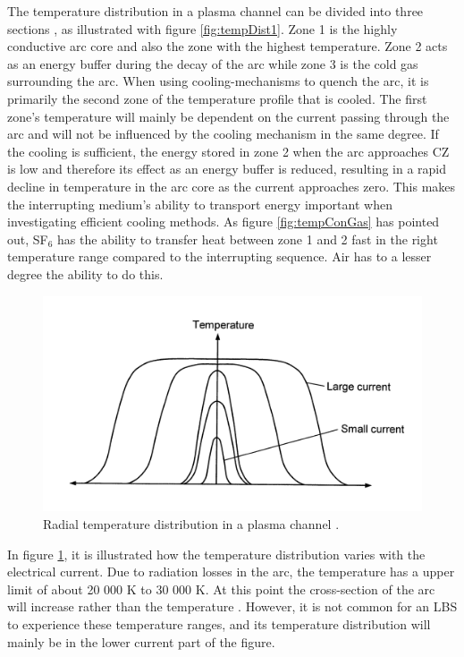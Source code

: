 \documentclass[10pt,a4paper,twoside]{article}
\begin{document}
The temperature distribution in a plasma channel can be divided into three sections \cite{bib:TDCIGBB}, as illustrated with figure \ref{fig:tempDist1}. Zone 1 is the highly conductive arc core and also the zone with the highest temperature. Zone 2 acts as an energy buffer during the decay of the arc while zone 3 is the cold gas surrounding the arc. When using cooling-mechanisms to quench the arc, it is primarily the second zone of the temperature profile that is cooled. The first zone's temperature will mainly be dependent on the current passing through the arc and will not be influenced by the cooling mechanism in the same degree. If the cooling is sufficient, the energy stored in zone 2 when the arc approaches CZ is low and therefore its effect as an energy buffer is reduced, resulting in a rapid decline in temperature in the arc core as the current approaches zero. This makes the interrupting medium's ability to transport energy important when investigating efficient cooling methods. As figure \ref{fig:tempConGas} has pointed out, SF$_6$ has the ability to transfer heat between zone 1 and 2 fast in the right temperature range compared to the interrupting sequence. Air has to a lesser degree the ability to do this.

\begin{figure}[H]
\centering
\includegraphics[scale=0.8]{Bilder/Theory/plasmaChannel1.png}
\caption{Radial temperature distribution in a plasma channel \cite{bib:HVEbreak}.} \label{fig:tempDist2}
\end{figure}

In figure \ref{fig:tempDist2}, it is illustrated how the temperature distribution varies with the electrical current. Due to radiation losses in the arc, the temperature has a upper limit of about 20 000 K to 30 000 K. At this point the cross-section of the arc will increase rather than the temperature \cite{bib:HVEbreak}. However, it is not common for an LBS to experience these temperature ranges, and its temperature distribution will mainly be in the lower current part of the figure.
\end{document}
